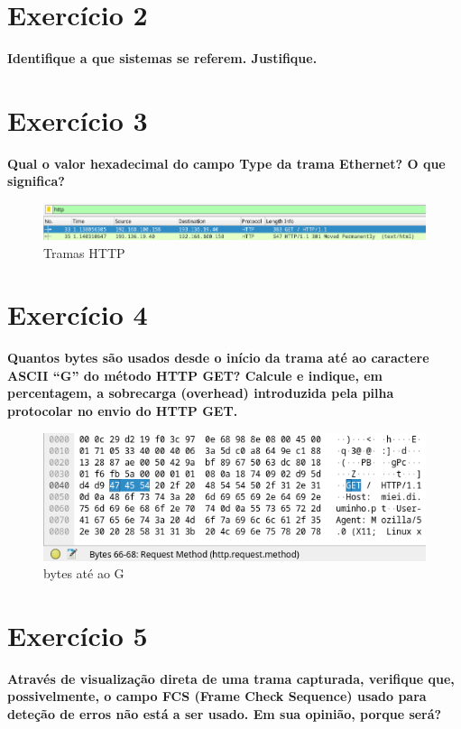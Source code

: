 \documentclass[a4paper]{report}
\begin{document}
\section{Exercício 2}
\textbf{Identifique a que sistemas se referem. Justifique.}


\section{Exercício 3}
\textbf{Qual o valor hexadecimal do campo Type da trama Ethernet? O que
significa?}

\begin{figure}[H]
    \centering 
    \includegraphics[width=\textwidth]{images/tramasHttp.png}  
    \caption{Tramas HTTP}
    \label{fig:tramasHttp}
\end{figure}


\section{Exercício 4}
\textbf{Quantos bytes são usados desde o início da trama até ao caractere ASCII
“G” do método HTTP GET? Calcule e indique, em percentagem, a sobrecarga
(overhead) introduzida pela pilha protocolar no envio do HTTP GET.}

\begin{figure}[H]
    \centering 
    \includegraphics[width=\textwidth]{images/bytes2G.png}
    \caption{bytes até ao G}
    \label{fig:bytes2G}
\end{figure}


\section{Exercício 5}
\textbf{Através de visualização direta de uma trama capturada, verifique que,
possivelmente, o campo FCS (Frame Check Sequence) usado para deteção de erros
não está a ser usado. Em sua opinião, porque será?}
\end{document}
